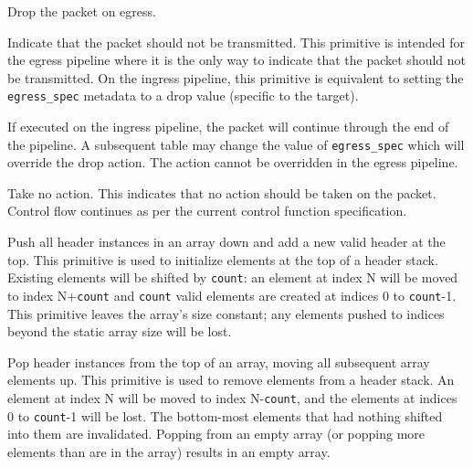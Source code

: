 \documentclass[12pt]{article}
\begin{document}

{ %
Drop the packet on egress.
}
{ %
}
{ %
Indicate that the packet should not be transmitted. This primitive is intended 
for the egress pipeline where it is the only way to indicate that the packet 
should not be transmitted. On the ingress pipeline, this primitive is equivalent 
to setting the \texttt{egress_spec} metadata to a drop value (specific to the target). 


If executed on the ingress pipeline, the packet will continue through the 
end of the pipeline. A subsequent table may change the value of \texttt{egress_spec} which 
will override the drop action. The action cannot be overridden in the egress 
pipeline.
}


{ %
Take no action.
}
{ %
}
{ %
This indicates that no action should be taken on the packet. Control flow 
continues as per the current control function specification. 
}


{ %
Push all header instances in an array down and add a new valid header at the top.
}
{ %
}
{ %
This primitive is used to initialize elements at the top of a header stack.
Existing elements will be shifted by \texttt{count}: an
element at index N will be moved to index N+\texttt{count} and 
\texttt{count} valid elements are created at indices 0 to 
\texttt{count}-1. 
This primitive leaves the array's size constant; any elements pushed to indices
beyond the static array size will be lost.
}


{ %
Pop header instances from the top of an array, moving all subsequent array elements up.
}
{ %
}
{ %
This primitive is used to remove elements from a header stack. An element at
index N will be moved to index N-\texttt{count}, and the elements at indices 0 to 
\texttt{count}-1 will be lost. The bottom-most elements that had nothing 
shifted into them are invalidated.
Popping from an empty array (or popping more elements than are in the array)
results in an empty array.
}
\end{document}
